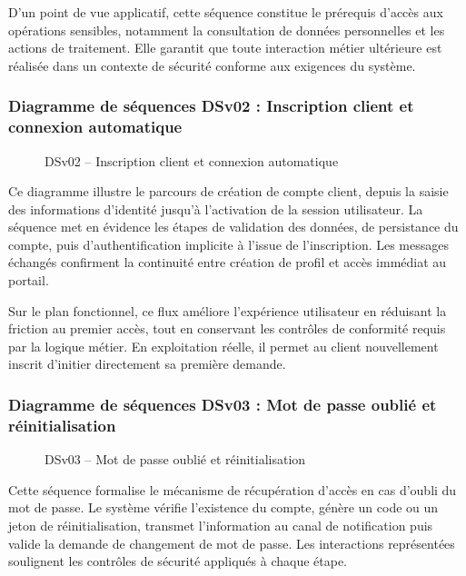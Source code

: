 D'un point de vue applicatif, cette séquence constitue le prérequis d'accès aux opérations sensibles, notamment la consultation de données personnelles et les actions de traitement. Elle garantit que toute interaction métier ultérieure est réalisée dans un contexte de sécurité conforme aux exigences du système.

\newpage
\subsubsection{Diagramme de séquences DSv02 : Inscription client et connexion automatique}

\begin{figure}[H]
  \centering
  
  \caption{DSv02 -- Inscription client et connexion automatique}
  \label{fig:dseq_dsv02}
\end{figure}

Ce diagramme illustre le parcours de création de compte client, depuis la saisie des informations d'identité jusqu'à l'activation de la session utilisateur. La séquence met en évidence les étapes de validation des données, de persistance du compte, puis d'authentification implicite à l'issue de l'inscription. Les messages échangés confirment la continuité entre création de profil et accès immédiat au portail.

Sur le plan fonctionnel, ce flux améliore l'expérience utilisateur en réduisant la friction au premier accès, tout en conservant les contrôles de conformité requis par la logique métier. En exploitation réelle, il permet au client nouvellement inscrit d'initier directement sa première demande.

\newpage
\subsubsection{Diagramme de séquences DSv03 : Mot de passe oublié et réinitialisation}

\begin{figure}[H]
  \centering
  
  \caption{DSv03 -- Mot de passe oublié et réinitialisation}
  \label{fig:dseq_dsv03}
\end{figure}

Cette séquence formalise le mécanisme de récupération d'accès en cas d'oubli du mot de passe. Le système vérifie l'existence du compte, génère un code ou un jeton de réinitialisation, transmet l'information au canal de notification puis valide la demande de changement de mot de passe. Les interactions représentées soulignent les contrôles de sécurité appliqués à chaque étape.


